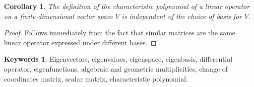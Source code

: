 \documentclass[12pt]{article}
\theoremstyle{plain}
\newtheorem{corollary}[theorem]{Corollary}
\theoremstyle{definition}
\newtheorem*{keywords}{Keywords}
\theoremstyle{remark}
\begin{document}
\begin{corollary}
The definition of the characteristic polynomial of a linear operator on a finite-dimensional vector space $V$ is independent of the choice of basis for $V$.
\end{corollary}

\begin{proof}
Follows immediately from the fact that similar matrices are the same linear operator expressed under different bases.
\end{proof}

\begin{keywords}
Eigenvectors, eigenvalues, eigenspace, eigenbasis, differential operator, eigenfunctions, algebraic and geometric multiplicities, change of coordinates matrix, scalar matrix, characteristic polynomial.
\end{keywords}
\end{document}
